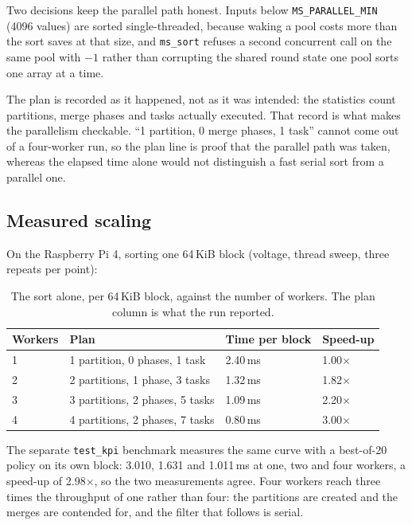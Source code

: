 \documentclass[12pt,a4paper,oneside]{report}
\begin{document}
Two decisions keep the parallel path honest. Inputs below
\texttt{MS\_PARALLEL\_MIN} (4096 values) are sorted single-threaded, because
waking a pool costs more than the sort saves at that size, and
\texttt{ms\_sort} refuses a second concurrent call on the same pool with $-1$
rather than corrupting the shared round state  one pool sorts one array at a
time.

The plan is recorded as it happened, not as it was intended: the statistics count
partitions, merge phases and tasks actually executed. That record is what makes
the parallelism checkable. ``1 partition, 0 merge phases, 1 task'' cannot come out
of a four-worker run, so the plan line is proof that the parallel path was taken,
whereas the elapsed time alone would not distinguish a fast serial sort from a
parallel one.

\subsection{Measured scaling}

On the Raspberry Pi 4, sorting one 64\,KiB block (voltage, thread sweep, three
repeats per point):

\begin{table}[htbp]
\centering
\caption{The sort alone, per 64\,KiB block, against the number of workers. The
plan column is what the run reported.}
\label{tab:merge-scaling}
\begin{tabular}{@{}llll@{}}
\hline
Workers & Plan & Time per block & Speed-up \\
\hline
1 & 1 partition, 0 phases, 1 task & 2.40\,ms & 1.00$\times$ \\
2 & 2 partitions, 1 phase, 3 tasks & 1.32\,ms & 1.82$\times$ \\
3 & 3 partitions, 2 phases, 5 tasks & 1.09\,ms & 2.20$\times$ \\
4 & 4 partitions, 2 phases, 7 tasks & 0.80\,ms & 3.00$\times$ \\
\hline
\end{tabular}
\end{table}

The separate \texttt{test\_kpi} benchmark measures the same curve with a best-of-20
policy on its own block: 3.010, 1.631 and 1.011\,ms at one, two and four workers,
a speed-up of 2.98$\times$, so the two measurements agree. Four workers reach
three times the throughput of one rather than four: the partitions are created and
the merges are contended for, and the filter that follows is serial.
\end{document}
